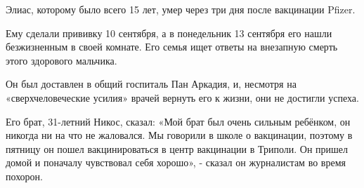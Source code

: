 Элиас, которому было всего 15 лет, умер через три дня после вакцинации Pfizer.

Ему сделали прививку 10 сентября, а в понедельник 13 сентября его нашли
безжизненным в своей комнате. Его семья ищет ответы на внезапную смерть этого
здорового мальчика.

Он был доставлен в общий госпиталь Пан Аркадия, и, несмотря на
«сверхчеловеческие усилия» врачей вернуть его к жизни, они не достигли успеха.

Его брат, 31-летний Никос, сказал: «Мой брат был очень сильным ребёнком, он
никогда ни на что не жаловался. Мы говорили в школе о вакцинации, поэтому в
пятницу он пошел вакцинироваться в центр вакцинации в Триполи. Он пришел домой и
поначалу чувствовал себя хорошо», - сказал он журналистам во время похорон.
